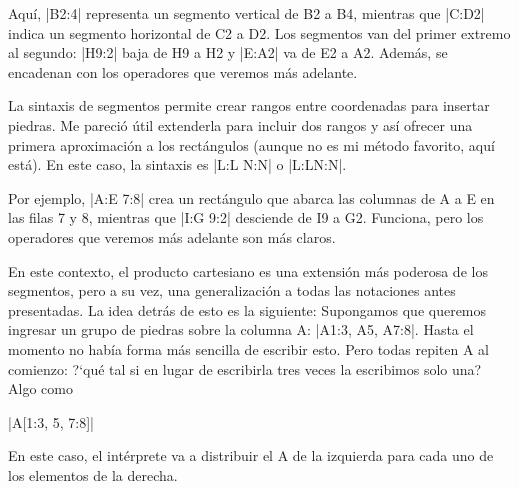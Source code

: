 Aquí, |B2:4| representa un segmento vertical de B2 a B4, mientras que |C:D2| indica un segmento horizontal de C2 a D2. Los segmentos van del primer extremo al segundo: |H9:2| baja de H9 a H2 y |E:A2| va de E2 a A2. Además, se encadenan con los operadores que veremos más adelante.

\begin{codeexample}[width=6cm]
	\begin{goban}[label = {at = all}]
	\end{goban}
\end{codeexample}


La sintaxis de segmentos permite crear rangos entre coordenadas para insertar piedras. Me pareció útil extenderla para incluir dos rangos y así ofrecer una primera aproximación a los rectángulos (aunque no es mi método favorito, aquí está). En este caso, la sintaxis es |L:L N:N| o |L:LN:N|. 

\begin{codeexample}[width=6cm]
	\begin{goban}[label = {at = all}]
	\end{goban}
\end{codeexample}

Por ejemplo, |A:E 7:8| crea un rectángulo que abarca las columnas de A a E en las filas 7 y 8, mientras que |I:G 9:2| desciende de I9 a G2. Funciona, pero los operadores que veremos más adelante son más claros.


	En este contexto, el producto cartesiano es una extensi\'on m\'as poderosa de los segmentos, pero a su vez, una generalizaci\'on a todas las notaciones antes presentadas. La idea detr\'as de esto es la siguiente: Supongamos que queremos ingresar un grupo de piedras sobre la columna A: |A1:3, A5, A7:8|. Hasta el momento no hab\'ia forma m\'as sencilla de escribir esto. Pero todas repiten A al comienzo: ?`qu\'e tal si en lugar de escribirla tres veces la escribimos solo una? Algo como
	\begin{center}
		|A[1:3, 5, 7:8]|
	\end{center}
	En este caso, el int\'erprete va a distribuir el A de la izquierda para cada uno de los elementos de la derecha.
	
